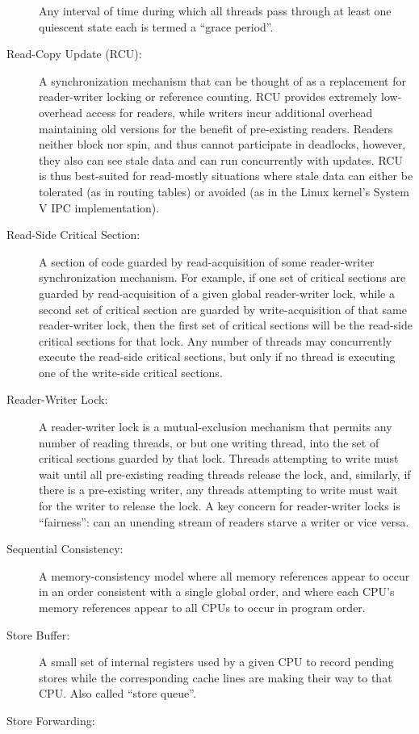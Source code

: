 \begin{description}
	Any interval of time during which all threads pass through at
	least one quiescent state each is termed a ``grace period''.
\item[Read-Copy Update (RCU):]
	A synchronization mechanism that can be thought of as a replacement
	for reader-writer locking or reference counting.
	RCU provides extremely low-overhead access for readers, while
	writers incur additional overhead maintaining old versions
	for the benefit of pre-existing readers.
	Readers neither block nor spin, and thus cannot participate in
	deadlocks, however, they also can see stale data and can
	run concurrently with updates.
	RCU is thus best-suited for read-mostly situations where
	stale data can either be tolerated (as in routing tables)
	or avoided (as in the Linux kernel's System V IPC implementation).
\item[Read-Side Critical Section:]
	A section of code guarded by read-acquisition of
	some reader-writer synchronization mechanism.
	For example, if one set of critical sections are guarded by
	read-acquisition of
	a given global reader-writer lock, while a second set of critical
	section are guarded by write-acquisition of that same reader-writer
	lock, then the first set of critical sections will be the
	read-side critical sections for that lock.
	Any number of threads may concurrently execute the read-side
	critical sections, but only if no thread is executing one of
	the write-side critical sections.
\item[Reader-Writer Lock:]
	A reader-writer lock is a mutual-exclusion mechanism that
	permits any number of reading
	threads, or but one writing thread, into the set of critical
	sections guarded by that lock.
	Threads attempting to write must wait until all pre-existing
	reading threads release the lock, and, similarly, if there
	is a pre-existing writer, any threads attempting to write must
	wait for the writer to release the lock.
	A key concern for reader-writer locks is ``fairness'':
	can an unending stream of readers starve a writer or vice versa.
\item[Sequential Consistency:]
	A memory-consistency model where all memory references appear to occur
	in an order consistent with
	a single global order, and where each CPU's memory references
	appear to all CPUs to occur in program order.
\item[Store Buffer:]
	A small set of internal registers used by a given CPU
	to record pending stores
	while the corresponding cache lines are making their
	way to that CPU.
	Also called ``store queue''.
\item[Store Forwarding:]

\end{description}
